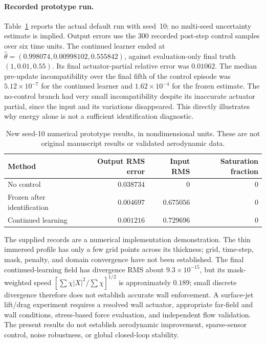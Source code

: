 \documentclass[10pt]{article}
\begin{document}
\paragraph{Recorded prototype run.}
Table~\ref{tab:afc_recorded} reports the actual default run with seed~10;
no multi-seed uncertainty estimate is implied. Output errors use the
300 recorded post-step control samples over six time units. The continued
learner ended at
$\widehat\theta=(0.998074,0.00998102,0.555842)$, against evaluation-only
final truth $(1,0.01,0.55)$. Its final actuator-partial relative error was
$0.01062$. The median pre-update incompatibility over the final fifth of
the control episode was $5.12\times10^{-7}$ for the continued learner and
$1.62\times10^{-4}$ for the frozen estimate. The no-control branch had
very small incompatibility despite its inaccurate actuator partial, since
the input and its variations disappeared. This directly illustrates why
energy alone is not a sufficient identification diagnostic.

\begin{table}[ht]
\centering
\caption{New seed-10 numerical prototype results, in nondimensional units.
These are not original manuscript results or validated aerodynamic data.}
\label{tab:afc_recorded}
\begin{tabular}{lrrr}
\toprule
Method & Output RMS error & Input RMS & Saturation fraction\\
\midrule
No control & $0.038734$ & $0$ & $0$\\
Frozen after identification & $0.004697$ & $0.675056$ & $0$\\
Continued learning & $0.001216$ & $0.729696$ & $0$\\
\bottomrule
\end{tabular}
\end{table}

The supplied records are a numerical implementation demonstration. The
thin immersed profile has only a few grid points across its thickness;
grid, time-step, mask, penalty, and domain convergence have not been
established. The final continued-learning field has divergence RMS about
$9.3\times10^{-15}$, but its mask-weighted speed
$[\sum\chi|X|^2/\sum\chi]^{1/2}$ is approximately $0.189$; small discrete
divergence therefore does not establish accurate wall enforcement.
A surface-jet lift/drag experiment requires a resolved wall
actuator, appropriate far-field and wall conditions, stress-based force
evaluation, and independent flow validation. The present results do not
establish aerodynamic improvement, sparse-sensor control, noise robustness,
or global closed-loop stability.



\end{document}
